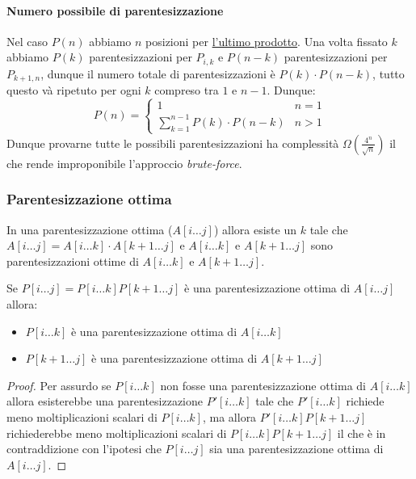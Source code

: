             \paragraph{Numero possibile di parentesizzazione} Nel caso $P(n)$ abbiamo $n$ posizioni per \underline{l'ultimo prodotto}. Una volta fissato $k$ abbiamo $P(k)$ parentesizzazioni per $P_{i,k}$ e $P(n-k)$ parentesizzazioni per $P_{k+1,n}$, dunque il numero totale di parentesizzazioni è $P(k)\cdot P(n-k)$, tutto questo và ripetuto per ogni $k$ compreso tra $1$ e $n-1$. Dunque:
            $$
                P(n)=\begin{cases}
                    1 & n=1\\
                    \sum_{k=1}^{n-1}P(k)\cdot P(n-k) & n>1
                \end{cases}
            $$
            Dunque provarne tutte le possibili parentesizzazioni ha complessità $\Omega\left(\frac{4^n}{\sqrt{n}}\right)$ il che rende improponibile l'approccio \textit{brute-force}.
        \subsubsection{Parentesizzazione ottima}
            In una parentesizzazione ottima ($A[i\dots j]$) allora esiste un $k$ tale che $A[i\dots j]=A[i\dots k]\cdot A[k+1\dots j]$ e $A[i\dots k]$ e $A[k+1\dots j]$ sono parentesizzazioni ottime di $A[i\dots k]$ e $A[k+1\dots j]$.
            \begin{theorem}
                Se $P[i\dots j]=P[i\dots k]P[k+1\dots j]$ è una parentesizzazione ottima di $A[i\dots j]$ allora:
                \begin{itemize}
                    \item $P[i\dots k]$ è una parentesizzazione ottima di $A[i\dots k]$
                    \item $P[k+1\dots j]$ è una parentesizzazione ottima di $A[k+1\dots j]$
                \end{itemize}
            \end{theorem}
            \begin{proof}
                Per assurdo se $P[i\dots k]$ non fosse una parentesizzazione ottima di $A[i\dots k]$ allora esisterebbe una parentesizzazione $P'[i\dots k]$ tale che $P'[i\dots k]$ richiede meno moltiplicazioni scalari di $P[i\dots k]$, ma allora $P'[i\dots k]P[k+1\dots j]$ richiederebbe meno moltiplicazioni scalari di $P[i\dots k]P[k+1\dots j]$ il che è in contraddizione con l'ipotesi che $P[i\dots j]$ sia una parentesizzazione ottima di $A[i\dots j]$.
            \end{proof}
